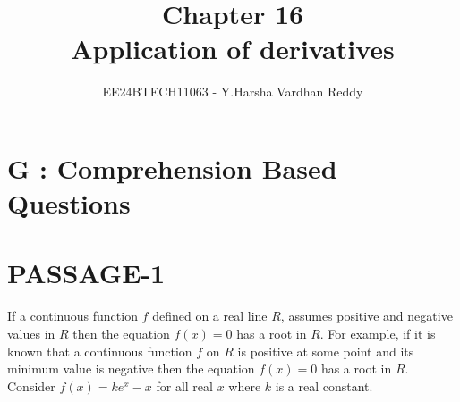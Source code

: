\documentclass[journal,,12pt,twocolumn]{IEEEtran}
\theoremstyle{remark}
\begin{document}

\vspace{3cm}

\title{Chapter 16\\Application of derivatives}
\author{EE24BTECH11063 - Y.Harsha Vardhan Reddy}
\maketitle
\newpage
\bigskip

\renewcommand{\thefigure}{\theenumi}
\renewcommand{\thetable}{\theenumi}

\section*{G : Comprehension Based Questions}
\section*{PASSAGE-1}
If a continuous function $f$  defined on a real line $R$, assumes positive and negative values in $R$ then the equation $f(x)=0$ has a root in $R$. For example, if it is known that a continuous function $f$ on $R$ is positive at some point and its minimum value is negative then the equation $f(x)=0$ has a root in $R$.\\
Consider $f(x)=ke^x-x$ for all real $x$ where $k$ is a real constant.
\end{document}
